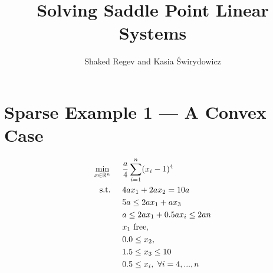\documentclass[11pt,letterpaper]{article}
\title{$ $
\\[-100pt] Solving Saddle Point Linear Systems}
\author{Shaked Regev and Kasia \'{S}wirydowicz}
\begin{document}

\section{Sparse Example 1 --- A Convex Case}
\begin{align}
&&&&\min_{x\in\mathbb{R}^n} & \hspace{0.5cm} \frac{a}{4}\sum_{i=1}^{n} (x_i-1)^4 &&&& \label{sp_ex1:obj}\\
&&&&\textnormal{s.t.} &\hspace{0.5cm}  4ax_1+2ax_2 = 10a &&&& \label{sp_ex1:eq1}\\
&&&&& \hspace{0.5cm} 5a \leq  2ax_1 + ax_3                 &&&& \label{sp_ex1:ineq1}\\
&&&&& \hspace{0.5cm}  a \leq  2ax_1       + 0.5ax_i \leq 2an &&&& \label{sp_ex1:ineq2}\\
&&&&& \hspace{0.5cm}  x_1~\textnormal{free}, &&&& \label{sp_ex1:varb1}\\
&&&&& \hspace{0.5cm}  0.0 \leq x_2, &&&& \label{sp_ex1:varb2}\\
&&&&& \hspace{0.5cm}  1.5 \leq x_3 \leq 10  &&&& \label{sp_ex1:varb3}\\
&&&&& \hspace{0.5cm}  0.5 \leq x_i, \ \forall i=4,...,n               &&& \label{sp_ex1:varb4}
\end{align}
\end{document}
